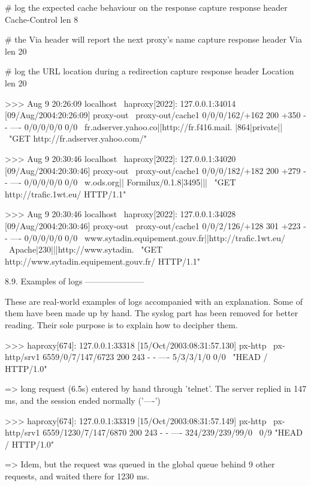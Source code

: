            # log the expected cache behaviour on the response
            capture response header Cache-Control len 8

            # the Via header will report the next proxy's name
            capture response header Via len 20

            # log the URL location during a redirection
            capture response header Location len 20

    >>> Aug  9 20:26:09 localhost \
          haproxy[2022]: 127.0.0.1:34014 [09/Aug/2004:20:26:09] proxy-out \
          proxy-out/cache1 0/0/0/162/+162 200 +350 - - ---- 0/0/0/0/0 0/0 \
          {fr.adserver.yahoo.co||http://fr.f416.mail.} {|864|private||} \
          "GET http://fr.adserver.yahoo.com/"

    >>> Aug  9 20:30:46 localhost \
          haproxy[2022]: 127.0.0.1:34020 [09/Aug/2004:20:30:46] proxy-out \
          proxy-out/cache1 0/0/0/182/+182 200 +279 - - ---- 0/0/0/0/0 0/0 \
          {w.ods.org||} {Formilux/0.1.8|3495|||} \
          "GET http://trafic.1wt.eu/ HTTP/1.1"

    >>> Aug  9 20:30:46 localhost \
          haproxy[2022]: 127.0.0.1:34028 [09/Aug/2004:20:30:46] proxy-out \
          proxy-out/cache1 0/0/2/126/+128 301 +223 - - ---- 0/0/0/0/0 0/0 \
          {www.sytadin.equipement.gouv.fr||http://trafic.1wt.eu/} \
          {Apache|230|||http://www.sytadin.} \
          "GET http://www.sytadin.equipement.gouv.fr/ HTTP/1.1"


8.9. Examples of logs
---------------------

These are real-world examples of logs accompanied with an explanation. Some of
them have been made up by hand. The syslog part has been removed for better
reading. Their sole purpose is to explain how to decipher them.

    >>> haproxy[674]: 127.0.0.1:33318 [15/Oct/2003:08:31:57.130] px-http \
          px-http/srv1 6559/0/7/147/6723 200 243 - - ---- 5/3/3/1/0 0/0 \
          "HEAD / HTTP/1.0"

    => long request (6.5s) entered by hand through 'telnet'. The server replied
       in 147 ms, and the session ended normally ('----')

    >>> haproxy[674]: 127.0.0.1:33319 [15/Oct/2003:08:31:57.149] px-http \
          px-http/srv1 6559/1230/7/147/6870 200 243 - - ---- 324/239/239/99/0 \
          0/9 "HEAD / HTTP/1.0"

    => Idem, but the request was queued in the global queue behind 9 other
       requests, and waited there for 1230 ms.

